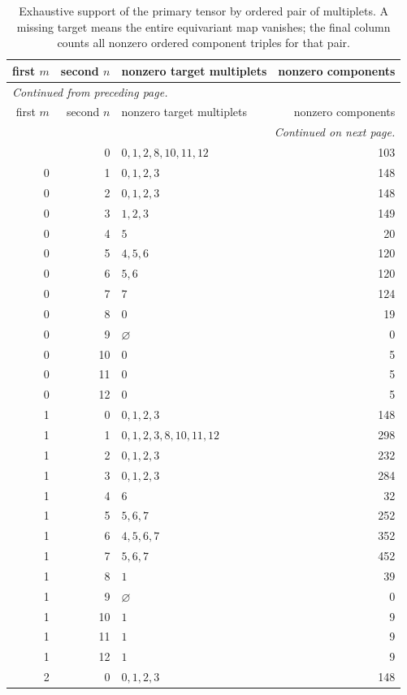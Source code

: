 \begingroup\small
\setlength{\tabcolsep}{5pt}
\begin{longtable}{rrlr}
\caption{Exhaustive support of the primary tensor by ordered pair of multiplets. A missing target means the entire equivariant map vanishes; the final column counts all nonzero ordered component triples for that pair.}\label{expphysics:coupling-support}\\
\toprule
first $m$ & second $n$ & nonzero target multiplets & nonzero components\\
\midrule
\endfirsthead
\multicolumn{4}{l}{\small\itshape Continued from preceding page.}\\
\toprule
first $m$ & second $n$ & nonzero target multiplets & nonzero components\\
\midrule
\endhead
\midrule
\multicolumn{4}{r}{\small\itshape Continued on next page.}\\
\endfoot
\bottomrule
\endlastfoot
0 & 0 & $0,1,2,8,10,11,12$ & 103\\
0 & 1 & $0,1,2,3$ & 148\\
0 & 2 & $0,1,2,3$ & 148\\
0 & 3 & $1,2,3$ & 149\\
0 & 4 & $5$ & 20\\
0 & 5 & $4,5,6$ & 120\\
0 & 6 & $5,6$ & 120\\
0 & 7 & $7$ & 124\\
0 & 8 & $0$ & 19\\
0 & 9 & $\varnothing$ & 0\\
0 & 10 & $0$ & 5\\
0 & 11 & $0$ & 5\\
0 & 12 & $0$ & 5\\
1 & 0 & $0,1,2,3$ & 148\\
1 & 1 & $0,1,2,3,8,10,11,12$ & 298\\
1 & 2 & $0,1,2,3$ & 232\\
1 & 3 & $0,1,2,3$ & 284\\
1 & 4 & $6$ & 32\\
1 & 5 & $5,6,7$ & 252\\
1 & 6 & $4,5,6,7$ & 352\\
1 & 7 & $5,6,7$ & 452\\
1 & 8 & $1$ & 39\\
1 & 9 & $\varnothing$ & 0\\
1 & 10 & $1$ & 9\\
1 & 11 & $1$ & 9\\
1 & 12 & $1$ & 9\\
2 & 0 & $0,1,2,3$ & 148\\

\end{longtable}
